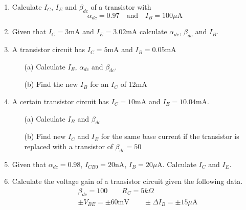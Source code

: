 \begin{enumerate}
\renewcommand{\labelenumi}{\bf\theenumi.}
\item Calculate $I_{C}$, $I_{E}$ and $\beta_{dc}$ of a transistor with
$$
\alpha_{dc}=0.97\quad\text{and}\quad I_{B}=100\mu\text{A}
$$

\item Given that $I_{C}=3\text{mA}$ and $I_{E}=3.02$mA calculate $\alpha_{dc}$, $\beta_{dc}$ and $I_{B}$.

\eject

\item A transistor circuit has $I_{C}=5\text{mA}$ and $I_{B}=0.05\text{mA}$
\begin{itemize}
\item[(a)] Calculate $I_{E}$, $\alpha_{dc}$ and $\beta_{dc}$.

\item[(b)] Find the new $I_{B}$ for an $I_{C}$ of 12mA
\end{itemize}

\item A certain transistor circuit has $I_{C}=10\text{mA}$ and $I_{E}=10.04\text{mA}$.
\begin{itemize}
\item[(a)] Calculate $I_{B}$ and $\beta_{dc}$

\item[(b)] Find new $I_{C}$ and $I_{E}$ for the same base current if the transistor is replaced with a transistor of $\beta_{dc}=50$
\end{itemize}

\item Given that $\alpha_{dc}=0.98$, $I_{CB0}=20\text{nA}$, $I_{B}=20\mu\text{A}$. Calculate $I_{C}$ and $I_{E}$.

\item Calculate the voltage gain of a transistor circuit given the following data.
\begin{align*}
& \beta_{dc}=100\qquad R_{C}=5k\Omega\\[3pt]
& \pm V_{BE}=\pm 60\text{mV}\qquad \pm \Delta I_{B}=\pm 15\mu\text{A}
\end{align*}

\end{enumerate}
